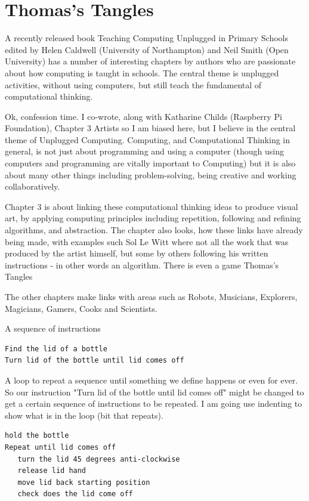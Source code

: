 
\chapter{Thomas's Tangles}
A recently released book Teaching Computing Unplugged in Primary Schools  edited by Helen Caldwell (University of Northampton) and Neil Smith (Open University) has a number of interesting chapters by authors who are passionate about how computing is taught in schools. The central theme is unplugged activities, without using computers, but still teach the fundamental of computational thinking.

Ok, confession time. I co-wrote, along with Katharine Childs (Raspberry Pi Foundation), Chapter 3 Artists so I am biased here, but I believe in the central theme of Unplugged Computing. Computing, and Computational Thinking in general,  is not just about programming and using a computer (though using computers and  programming are vitally important to Computing) but it is also about many other things including problem-solving, being creative and working collaboratively.

Chapter 3 is about linking these computational thinking ideas to produce visual art, by applying computing principles including  repetition, following and refining algorithms, and abstraction. The chapter also looks, how these links have already being made, with examples such Sol Le Witt where not all the work that was produced by the artist himself, but some by others following his written instructions - in other words an algorithm. There is even a game Thomas's Tangles

The other chapters make links with areas such as Robots, Musicians, Explorers, Magicians, Gamers, Cooks and Scientists.


A sequence of instructions
\begin{lstlisting}
Find the lid of a bottle
Turn lid of the bottle until lid comes off
\end{lstlisting}

A loop to repeat a sequence until something we define happens or even for ever. So our instruction "Turn lid of the bottle until lid comes off" might be changed to get a certain sequence of instructions to be repeated. I am going use indenting to show what is in the loop (bit that repeats).
\begin{lstlisting}
hold the bottle
Repeat until lid comes off
   turn the lid 45 degrees anti-clockwise
   release lid hand 
   move lid back starting position
   check does the lid come off
\end{lstlisting}

